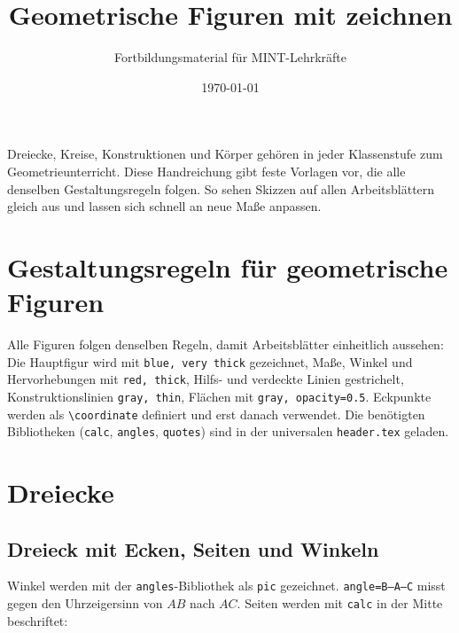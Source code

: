 



\title{Geometrische Figuren mit \TikZ zeichnen}
\author{Fortbildungsmaterial für MINT-Lehrkräfte}
\date{\today}
\pagestyle{plain}
\setlength{\parskip}{1.5em} %




\maketitle

Dreiecke, Kreise, Konstruktionen und Körper gehören in jeder Klassenstufe zum Geometrieunterricht. Diese Handreichung gibt feste Vorlagen vor, die alle denselben Gestaltungsregeln folgen. So sehen Skizzen auf allen Arbeitsblättern gleich aus und lassen sich schnell an neue Maße anpassen.



\section{Gestaltungsregeln für geometrische Figuren}

Alle Figuren folgen denselben Regeln, damit Arbeitsblätter einheitlich aussehen: Die Hauptfigur wird mit \texttt{blue, very thick} gezeichnet, Maße, Winkel und Hervorhebungen mit \texttt{red, thick}, Hilfs- und verdeckte Linien gestrichelt, Konstruktionslinien \texttt{gray, thin}, Flächen mit \texttt{gray, opacity=0.5}. Eckpunkte werden als \texttt{\textbackslash coordinate} definiert und erst danach verwendet. Die benötigten Bibliotheken (\texttt{calc}, \texttt{angles}, \texttt{quotes}) sind in der universalen \texttt{header.tex} geladen.



\section{Dreiecke}


\subsection{Dreieck mit Ecken, Seiten und Winkeln}

Winkel werden mit der \texttt{angles}-Bibliothek als \texttt{pic} gezeichnet. \texttt{angle=B--A--C} misst gegen den Uhrzeigersinn von $AB$ nach $AC$. Seiten werden mit \texttt{calc} in der Mitte beschriftet:

